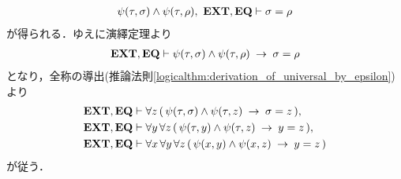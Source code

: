 \begin{sketch}
\begin{description}
				\begin{align}
					\psi(\tau,\sigma) \wedge \psi(\tau,\rho),\ \EXTAX,\EQAX 
					\vdash \sigma = \rho
				\end{align}
				が得られる．ゆえに演繹定理より
				\begin{align}
					\mbox{{\bf EXT}},\mbox{{\bf EQ}} \vdash \psi(\tau,\sigma) \wedge \psi(\tau,\rho)
					\hspace{0.25em}\rightarrow\hspace{0.25em} \sigma = \rho
				\end{align}
				となり，全称の導出(推論法則\ref{logicalthm:derivation_of_universal_by_epsilon})より
				\begin{align}
					\mbox{{\bf EXT}},\mbox{{\bf EQ}} &\vdash \forall z\, 
						(\, \psi(\tau,\sigma) \wedge \psi(\tau,z) 
						\hspace{0.25em}\rightarrow\hspace{0.25em} \sigma = z\, ), \\
					\mbox{{\bf EXT}},\mbox{{\bf EQ}} &\vdash \forall y\, \forall z\, 
						(\, \psi(\tau,y) \wedge \psi(\tau,z) \hspace{0.25em}\rightarrow\hspace{0.25em} y = z\, ), \\
					\mbox{{\bf EXT}},\mbox{{\bf EQ}} &\vdash \forall x\, \forall y\, \forall z\, 
						(\, \psi(x,y) \wedge \psi(x,z) \hspace{0.25em}\rightarrow\hspace{0.25em} y = z\, )
				\end{align}
				が従う．
			

\end{description}
\end{sketch}
